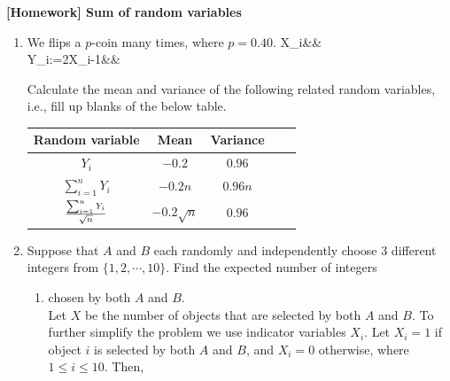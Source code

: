 \documentclass[12pt]{article}%
\newcommand{\0}{{\bf 0}}
\newcommand{\ra}[1]{\renewcommand{\arraystretch}{#1}}
\begin{document}
\newcommand{\ngi}{n \ra \infty}

\pagestyle{myheadings} 

\thispagestyle{plain}


\begin{center}
{\Large{\bf [Homework] Sum of random variables}} 
\end{center}


\begin{enumerate}





 \item
We flips a $p$-coin many times, where $p=0.40$.
\bea
X_i&&\nn\\
Y_i:=2X_i-1&&\nn
\eea

Calculate the mean and variance of the following related random variables,
i.e., fill up blanks of the below table.
\begin{table}[H]    \center
\begin{tabular}{|c||c|c|c||c|} \hline
Random variable&Mean&Variance\\\hline\hline  
$Y_i$&$-0.2$&$0.96$\\\hline
$\sum_{i=1}^nY_i$&$-0.2n$&$0.96n$\\\hline
$\frac{\sum_{i=1}^nY_i}{\sqrt{n}}$&$-0.2\sqrt{n}$&$0.96$\\\hline
\end{tabular}
\end{table}





 
 
 
 
 
 
\item
Suppose that $A$ and $B$ each randomly and independently choose 3 different integers from $\{1,2,\cdots,10\}$. Find the expected number of integers
\begin{enumerate}
\item chosen by both $A$ and $B$.
\\
{\color{blue}{\bf Sol.}}
Let $X$ be the number of objects that are selected by both $A$ and $B$. To further simplify
 the problem we use indicator variables $X_i$. Let $X_i = 1$ if object $i$ is selected by both $A$
 and $B$, and $X_i = 0$ otherwise, where $1\le i\le10$. Then,


\end{enumerate}
\end{enumerate}
\end{document}
